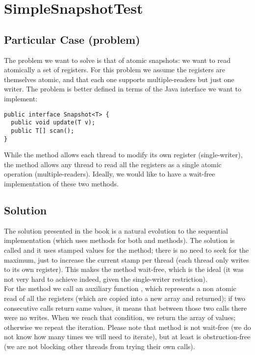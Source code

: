 \section{\textbf{SimpleSnapshotTest}}

\subsection{Particular Case (problem)}
The problem we want to solve is that of atomic snapshots: we want to
read atomically a set of registers. For this problem we assume the
registers are themselves atomic, and that each one supports
multiple-readers but just one writer. The problem is better defined in 
terms of the Java interface we want to implement: \\

\begin{lstlisting}[style=nonumbers]
public interface Snapshot<T> {
  public void update(T v);
  public T[] scan();
}
\end{lstlisting}
\hfill

While the method  allows each thread to modify its own
register (single-writer), the  method allows any thread to
read all the registers as a single atomic operation
(multiple-readers). Ideally, we would like to have a wait-free
implementation of these two methods.

\subsection{Solution}
The solution presented in the book is a natural evolution to the
sequential implementation (which uses  methods for
both  and  methods). The solution is called
 and it uses stamped values for the 
method; there is no need to seek for the maximum, just to increase the
current stamp per thread (each thread only writes to its own
register). This makes the  method wait-free, which is the
ideal (it was not very hard to achieve indeed, given the single-writer
restriction). \\

For the  method we call an auxiliary function ,
which represents a non atomic read of all the registers (which are
copied into a new array and returned); if two
consecutive  calls return same values, it means that between
those two calls there were no writes. When we reach that condition, we
return the array of values; otherwise we repeat the iteration. Please
note that  method is not wait-free (we do not know how many
times we will need to iterate), but at least is
obstruction-free (we are not blocking other threads from trying their
own  calls). \\

